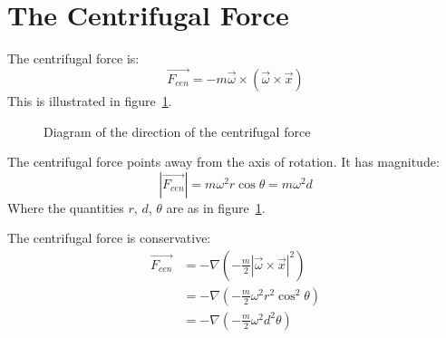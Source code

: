 \documentclass[../Main.tex]{subfiles}
\begin{document}
\section{The Centrifugal Force}
The centrifugal force is:
\begin{equation}
    \vec{F_{cen}} = -m \vec{\omega} \times (\vec{\omega} \times \vec{x})
    \label{eqnCentrifugal}
\end{equation}
This is illustrated in figure~\ref{figCentrifugal}.
\begin{figure}[ht]
    \centering
    \caption{Diagram of the direction of the centrifugal force}
    \label{figCentrifugal}
\end{figure}
The centrifugal force points away from the axis of rotation. It has magnitude:
\begin{equation*}
    |\vec{F_{cen}}| = m\omega^2 r \cos{\theta} = m\omega^2d
\end{equation*}
Where the quantities $r$, $d$, $\theta$ are as in figure~\ref{figCentrifugal}.\par
The centrifugal force is conservative:
\begin{align*}
    \vec{F_{cen}} &= -\nabla\left(-\frac{m}{2}|\vec{\omega} \times \vec{x}|^2\right) \\
    &= -\nabla\left(-\frac{m}{2}\omega^2r^2\cos^2\theta\right) \\
    &= -\nabla\left(-\frac{m}{2}\omega^2d^2\theta\right)
\end{align*}
\end{document}
